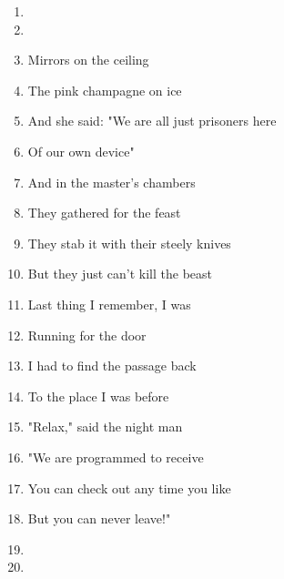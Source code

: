 \documentclass{article}
\begin{document}
\begin{center}
\begin{enumerate}
            \item[]
            \item[] 
            \item Mirrors on the ceiling
            \item The pink champagne on ice
            \item And she said: "We are all just prisoners here
            \item Of our own device"
            \item And in the master's chambers
            \item They gathered for the feast
            \item They stab it with their steely knives
            \item But they just can't kill the beast
            \item Last thing I remember, I was
            \item Running for the door
            \item I had to find the passage back
            \item To the place I was before
            \item "Relax," said the night man
            \item "We are programmed to receive
            \item You can check out any time you like
            \item But you can never leave!"

            \item[]
            \item[] \instrumental

        \end{enumerate}
    \end{center}
\end{document}
